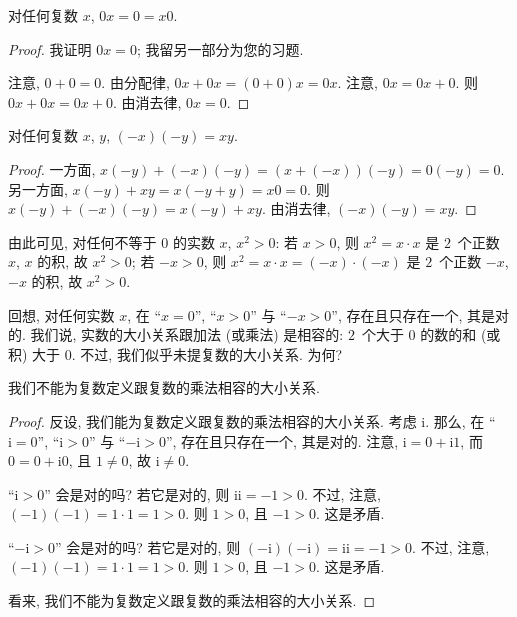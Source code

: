 \documentclass[../libro.tex]{subfiles}
\begin{document}
\begin{theorem}
    对任何复数 \(x\),
    \(0x = 0 = x0\).
\end{theorem}

\begin{proof}
    我证明 \(0x = 0\);
    我留另一部分为您的习题.

    注意, \(0 + 0 = 0\).
    由分配律, \(0x + 0x = (0 + 0)x = 0x\).
    注意, \(0x = 0x + 0\).
    则 \(0x + 0x = 0x + 0\).
    由消去律, \(0x = 0\).
\end{proof}

\begin{theorem}
    对任何复数 \(x\), \(y\),
    \((-x) (-y) = x y\).
\end{theorem}

\begin{proof}
    一方面,
    \(x (-y) + (-x) (-y) = (x + (-x)) (-y) = 0 (-y) = 0\).
    另一方面,
    \(x (-y) + x y = x (-y + y) = x 0 = 0\).
    则 \(x (-y) + (-x) (-y) = x (-y) + x y\).
    由消去律, \((-x) (-y) = x y\).
\end{proof}

由此可见, 对任何不等于 \(0\) 的实数 \(x\),
\(x^2 > 0\):
若 \(x > 0\), 则 \(x^2 = x \cdot x\)
是 \(2\)~个正数 \(x\), \(x\) 的积,
故 \(x^2 > 0\);
若 \(-x > 0\), 则
\(x^2 = x \cdot x = (-x) \cdot (-x)\)
是 \(2\)~个正数 \(-x\), \(-x\) 的积,
故 \(x^2 > 0\).

回想, 对任何实数 \(x\),
在 ``\(x = 0\)'',
``\(x > 0\)''
与 ``\(-x > 0\)'',
存在且只存在一个, 其是对的.
我们说, 实数的大小关系跟加法 (或乘法) 是相容的:
\(2\)~个大于 \(0\) 的数的和 (或积) 大于 \(0\).
不过, 我们似乎未提复数的大小关系.
为何?

\begin{theorem}
    我们不能为复数定义跟复数的乘法相容的大小关系.
\end{theorem}

\begin{proof}
    反设, 我们能为复数定义跟复数的乘法相容的大小关系.
    考虑 \(\mathrm{i}\).
    那么,
    在 ``\(\mathrm{i} = 0\)'',
    ``\(\mathrm{i} > 0\)''
    与 ``\(-\mathrm{i} > 0\)'',
    存在且只存在一个, 其是对的.
    注意, \(\mathrm{i} = 0 + \mathrm{i} 1\),
    而 \(0 = 0 + \mathrm{i} 0\),
    且 \(1 \neq 0\),
    故 \(\mathrm{i} \neq 0\).

    ``\(\mathrm{i} > 0\)'' 会是对的吗?
    若它是对的, 则
    \(\mathrm{i} \mathrm{i} = -1 > 0\).
    不过, 注意,
    \((-1) (-1) = 1 \cdot 1 = 1 > 0\).
    则 \(1 > 0\), 且 \(-1 > 0\).
    这是矛盾.

    ``\(-\mathrm{i} > 0\)'' 会是对的吗?
    若它是对的, 则
    \((-\mathrm{i}) (-\mathrm{i})
    = \mathrm{i} \mathrm{i} = -1 > 0\).
    不过, 注意,
    \((-1) (-1) = 1 \cdot 1 = 1 > 0\).
    则 \(1 > 0\), 且 \(-1 > 0\).
    这是矛盾.

    看来, 我们不能为复数定义跟复数的乘法相容的大小关系.
\end{proof}
\end{document}
